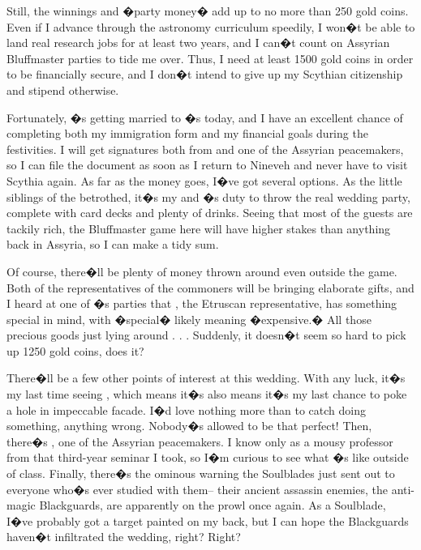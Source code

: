 \documentclass[char]{Kos}
\begin{document}
Still, the winnings and �party money� add up to no more than 250 gold coins. Even if I advance through the astronomy curriculum speedily, I won�t be able to land real research jobs for at least two years, and I can�t count on Assyrian Bluffmaster parties to tide me over. Thus, I need at least 1500 gold coins in order to be financially secure, and I don�t intend to give up my Scythian citizenship and stipend otherwise.

Fortunately, \cBride{\nickname}�s getting married to \cPoet{\nickname}�s \cGroom{\sibling} \cGroom{\nickname} today, and I have an excellent chance of completing both my immigration form and my financial goals during the festivities. I will get signatures both from \cScythiaKing{\nickname} and one of the Assyrian peacemakers, so I can file the document as soon as I return to Nineveh and never have to visit Scythia again. As far as the money goes, I�ve got several options. As the little siblings of the betrothed, it�s my and \cPoet{\nickname}�s duty to throw the real wedding party, complete with card decks and plenty of drinks. Seeing that most of the guests are tackily rich, the Bluffmaster game here will have higher stakes than anything back in Assyria, so I can make a tidy sum.

Of course, there�ll be plenty of money thrown around even outside the game. Both of the representatives of the commoners will be bringing elaborate gifts, and I heard at one of \cPoet{\nickname}�s parties that \cMerchant{\nickname}, the Etruscan representative, has something special in mind, with �special� likely meaning �expensive.� All those precious goods just lying around . . . Suddenly, it doesn�t seem so hard to pick up 1250 gold coins, does it?

There�ll be a few other points of interest at this wedding. With any luck, it�s my last time seeing \cBride{\nickname}, which means it�s also means it�s my last chance to poke a hole in \cBride{\their} impeccable facade. I�d love nothing more than to catch \cBride{\them} doing something, anything wrong. Nobody�s allowed to be that perfect! Then, there�s \cAnarchist{\nickname}, one of the Assyrian peacemakers. I know \cAnarchist{\nickname} only as a mousy professor from that third-year seminar I took, so I�m curious to see what \cAnarchist{\they}�s like outside of class. Finally, there�s the ominous warning the Soulblades just sent out to everyone who�s ever studied with them-- their ancient assassin enemies, the anti-magic Blackguards, are apparently on the prowl once again. As a Soulblade, I�ve probably got a target painted on my back, but I can hope the Blackguards haven�t infiltrated the wedding, right? Right?
\end{document}
